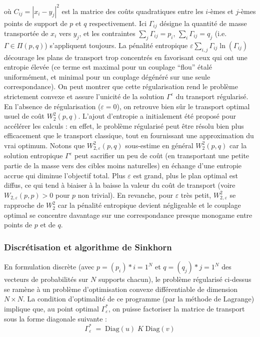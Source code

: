 où $C_{ij} = |x_i - y_j|^2$ est la matrice des coûts quadratiques entre les $i$-èmes et $j$-èmes points de support de $p$ et $q$ respectivement. Ici $\Gamma_{ij}$ désigne la quantité de masse transportée de $x_i$ vers $y_j$, et les contraintes $\sum_j \Gamma_{ij}=p_i$, $\sum_i \Gamma_{ij}=q_j$ (i.e. $\Gamma\in\Pi(p,q)$) s’appliquent toujours. La pénalité entropique $ \varepsilon \sum_{i,j}\Gamma_{ij}\ln(\Gamma_{ij})$ décourage les plans de transport trop concentrés en favorisant ceux qui ont une entropie élevée (ce terme est maximal pour un couplage “flou” étalé uniformément, et minimal pour un couplage dégénéré sur une seule correspondance). On peut montrer que cette régularisation rend le problème strictement convexe et assure l’unicité de la solution $\Gamma^{\varepsilon}$ du transport régularisé. En l’absence de régularisation ($\varepsilon=0$), on retrouve bien sûr le transport optimal usuel de coût $W_2^2(p,q)$. L’ajout d’entropie a initialement été proposé pour accélérer les calculs : en effet, le problème régularisé peut être résolu bien plus efficacement que le transport classique, tout en fournissant une approximation du vrai optimum. Notons que $W_{2,\varepsilon}^2(p,q)$ sous-estime en général $W_2^2(p,q)$ car la solution entropique $\Gamma^{\varepsilon}$ peut sacrifier un peu de coût (en transportant une petite partie de la masse vers des cibles moins naturelles) en échange d’une entropie accrue qui diminue l’objectif total. Plus $\varepsilon$ est grand, plus le plan optimal est diffus, ce qui tend à biaiser à la baisse la valeur du coût de transport (voire $W_{2,\varepsilon}(p,p) > 0$ pour $p$ non trivial). En revanche, pour $\varepsilon$ très petit, $W_{2,\varepsilon}^2$ se rapproche de $W_2^2$ car la pénalité entropique devient négligeable et le couplage optimal se concentre davantage sur une correspondance presque monogame entre points de $p$ et de $q$.

\subsubsection{Discrétisation et algorithme de Sinkhorn}

En formulation discrète (avec $p=(p_i)*{i=1}^N$ et $q=(q_j)*{j=1}^N$ des vecteurs de probabilités sur $N$ supports chacun), le problème régularisé ci-dessus se ramène à un problème d’optimisation convexe différentiable de dimension $N\times N$. La condition d’optimalité de ce programme (par la méthode de Lagrange) implique que, au point optimal $\Gamma^*_{\varepsilon}$, on puisse factoriser la matrice de transport sous la forme diagonale suivante :
\begin{equation}
\Gamma^*_{\varepsilon} \;=\; \mathrm{Diag}(u)\;K\;\mathrm{Diag}(v)
\end{equation}

